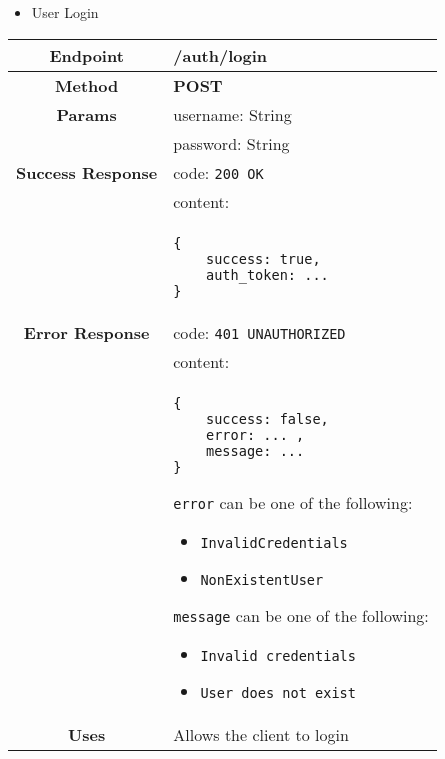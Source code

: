     \begin{itemize}
        \item User Login
    \end{itemize}
    \begin{adjustwidth}{1cm}{}
        \begin{tabular}{|c|l|}
            \hline
            \textbf{Endpoint} & /auth/login \\
            \hline
            \textbf{Method} & \textbf{POST} \\
            \hline
            \textbf{Params} & username: String \\
            &                 password: String \\
            \hline
            \textbf{Success Response} & code: \texttt{200 OK} \\
            &                           content: \\
            & \begin{minipage}[t]{0.5\textwidth}
                \begin{adjustwidth}{1.5cm}{}
                \begin{verbatim}
{
    success: true, 
    auth_token: ...
}
                \end{verbatim}
                \end{adjustwidth}
              \end{minipage} \\
              \hline
            \textbf{Error Response} & code: \texttt{401 UNAUTHORIZED} \\
            &                         content: \\
            & \begin{minipage}[t]{0.7\textwidth}
                \begin{adjustwidth}{1.5cm}{}
                \begin{verbatim}
{
    success: false, 
    error: ... ,
    message: ...
}
                \end{verbatim}
                \end{adjustwidth}
                \texttt{error} can be one of the following: 
                \begin{itemize}
                    \item \texttt{InvalidCredentials}
                    \item \texttt{NonExistentUser}
                \end{itemize}
                 \texttt{message} can be one of the following: 
                \begin{itemize}
                    \item \texttt{Invalid credentials}
                    \item \texttt{User does not exist}
                \end{itemize}
              \end{minipage} \\
              \hline
            \textbf{Uses} & Allows the client to login \\
            \hline
        \end{tabular}
    \end{adjustwidth}
    
